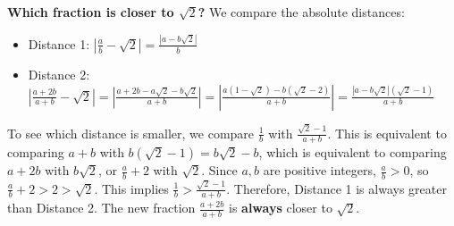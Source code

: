 \textbf{Which fraction is closer to $\sqrt{2}$?}
We compare the absolute distances:
\begin{itemize}
\item Distance 1: $\left|\frac{a}{b} - \sqrt{2}\right| = \frac{|a - b\sqrt{2}|}{b}$
\item Distance 2: $\left|\frac{a + 2b}{a + b} - \sqrt{2}\right| = \left|\frac{a + 2b - a\sqrt{2} - b\sqrt{2}}{a + b}\right| = \left|\frac{a(1-\sqrt{2}) - b(\sqrt{2}-2)}{a + b}\right| = \frac{|a - b\sqrt{2}|(\sqrt{2}-1)}{a+b}$
\end{itemize}
To see which distance is smaller, we compare $\frac{1}{b}$ with $\frac{\sqrt{2}-1}{a+b}$.
This is equivalent to comparing $a+b$ with $b(\sqrt{2}-1) = b\sqrt{2} - b$, which is equivalent to comparing $a+2b$ with $b\sqrt{2}$, or $\frac{a}{b} + 2$ with $\sqrt{2}$.
Since $a, b$ are positive integers, $\frac{a}{b} > 0$, so $\frac{a}{b} + 2 > 2 > \sqrt{2}$.
This implies $\frac{1}{b} > \frac{\sqrt{2}-1}{a+b}$.
Therefore, Distance 1 is always greater than Distance 2. The new fraction $\frac{a+2b}{a+b}$ is \textbf{always} closer to $\sqrt{2}$.

